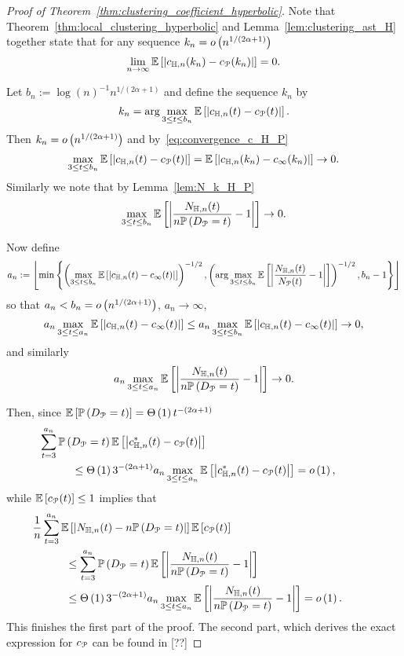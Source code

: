 \begin{proof}[Proof of Theorem~\ref{thm:clustering_coefficient_hyperbolic}]
Note that Theorem~\ref{thm:local_clustering_hyperbolic} and Lemma~\ref{lem:clustering_ast_H} together state that for any sequence $k_n  = o\left(n^{1/(2\alpha + 1)}\right)$
\begin{equation}\label{eq:convergence_c_H_P}
	\lim_{n \to \infty} \mathbb{E}\left[\left|c_{\mathbb{H},n}(k_n) - c_{{\mathcal P}}(k_n)\right|\right] = 0.
\end{equation}

Let $b_n := \log(n)^{-1} n^{1/(2\alpha + 1)}$ and define the sequence $k_n$ by
\[
	k_n = \arg \max_{3 \le t \le b_n} \mathbb{E}\left[\left|c_{\mathbb{H},n}(t) - c_{{\mathcal P}}(t)\right|\right].
\]
Then $k_n = o\left(n^{1/(2\alpha + 1)}\right)$ and by~\eqref{eq:convergence_c_H_P}
\[
	\max_{3 \le t \le b_n} \mathbb{E}\left[\left|c_{\mathbb{H},n}(t) - c_{{\mathcal P}}(t)\right|\right] = \mathbb{E}\left[\left|c_{\mathbb{H},n}(k_n) - c_{\infty}(k_n)\right|\right] \to 0.
\]
Similarly we note that by Lemma~\ref{lem:N_k_H_P}
\[
	\max_{3 \le t \le b_n} \mathbb{E}\left[\left|\frac{N_{\mathbb{H},n}(t)}{n \mathbb{P}\left(D_{{\mathcal P}} = t\right)} - 1\right|\right] \to 0.
\]

Now define
\[
	a_n := \left\lfloor \min \left\{
	\left(\max_{3 \le t \le b_n} \mathbb{E}\left[\left|c_{\mathbb{H},n}(t) - c_{\infty}(t)\right|\right]\right)^{-1/2},
	\left(\arg \max_{3 \le t \le b_n} \mathbb{E}\left[\left|\frac{N_{\mathbb{H},n}(t)}{N_{{\mathcal P}}(t)} - 1\right|\right]\right)^{-1/2},
	b_n - 1 \right\} \right\rfloor
\]
so that $a_n < b_n = o\left(n^{1/(2\alpha + 1)}\right)$, $a_n \to \infty$, 
\[
	a_n \max_{3 \le t \le a_n} \mathbb{E}\left[\left|c_{\mathbb{H},n}(t) - c_{\infty}(t)\right|\right] 
	\le a_n \max_{3 \le t \le b_n} \mathbb{E}\left[\left|c_{\mathbb{H},n}(t) - c_{\infty}(t)\right|\right] \to 0,
\]
and similarly
\[
	a_n \max_{3 \le t \le a_n} \mathbb{E}\left[\left|\frac{N_{\mathbb{H},n}(t)}{n \mathbb{P}\left(D_{{\mathcal P}} = t\right)} - 1\right|\right] \to 0.
\]

Then, since $\mathbb{E}\left[\mathbb{P}\left(D_{{\mathcal P}} = t\right)\right] = \Theta\left(1\right) t^{-(2\alpha + 1)}$
\begin{align*}
	&\hspace{-30pt}\sum_{t = 3}^{a_n} \Prob{D_\Pcal = t} \Exp{\left|c_{\H,n}^\ast(t) - c_{\Pcal}(t)\right|}\\
	&\le \bigT{1} 3^{-(2\alpha+1)} a_n \max_{3 \le t \le a_n} \Exp{\left|c_{\H,n}^\ast(t) - c_{\Pcal}(t)\right|}
	= \smallO{1},
\end{align*}
while $\mathbb{E}\left[c_{{\mathcal P}}(t)\right] \le 1$ implies that
\begin{align*}
	&\hspace{-30pt}\frac{1}{n} \sum_{t = 3}^{a_n} \Exp{\left|N_{\H,n}(t) - n \Prob{D_\Pcal = t}\right|}\Exp{c_\Pcal(t)} \\
	&\le \sum_{t = 3}^{a_n} \Prob{D_\Pcal = t} \Exp{\left|\frac{N_{\H,n}(t)}{n \Prob{D_\Pcal = t}} - 1\right|} \\
	&\le \bigT{1} 3^{-(2\alpha+1)} a_n \max_{3 \le t \le a_n} 
		\Exp{\left|\frac{N_{\H,n}(t)}{n \Prob{D_\Pcal = t}} - 1\right|} = \smallO{1}.
\end{align*}
This finishes the first part of the proof. The second part, which derives the exact expression for $c_{{\mathcal P}}$ can be found in [??] 
\end{proof}